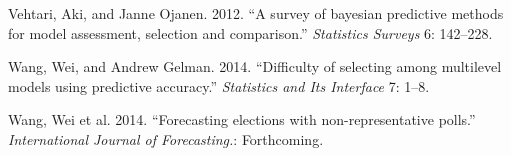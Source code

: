\documentclass[11pt,article,oneside]{memoir}
\begin{document}
Vehtari, Aki, and Janne Ojanen. 2012. ``A survey of bayesian predictive
methods for model assessment, selection and comparison.''
\emph{Statistics Surveys} 6: 142--228.

Wang, Wei, and Andrew Gelman. 2014. ``Difficulty of selecting among
multilevel models using predictive accuracy.'' \emph{Statistics and Its
Interface} 7: 1--8.

Wang, Wei et al. 2014. ``Forecasting elections with non-representative
polls.'' \emph{International Journal of Forecasting.}: Forthcoming.
\end{document}
